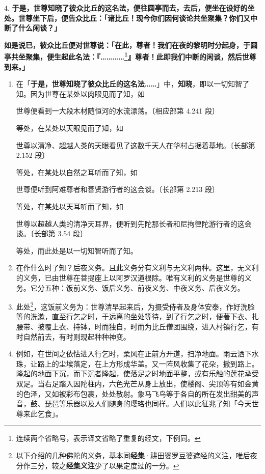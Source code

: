 {\Large 4.} \textbf{于是，世尊知晓了彼众比丘的这名法，便往圆亭而去，去后，便坐在设好的坐处。世尊坐下后，便告众比丘：「诸比丘！现今你们因何谈论共坐聚集？你们又中断了什么闲谈？」}

\textbf{如是说已，彼众比丘便对世尊说：「在此，尊者！我们在夜的黎明时分起身，于圆亭共坐聚集，便生起此名法：『…………\footnote{连续两个省略号，表示译文省略了重复的经文，下例同。}』尊者！此即我们中断的闲谈，然后世尊到来。」}

\begin{enumerate}\item 在「\textbf{于是，世尊知晓了彼众比丘的这名法……}」中，\textbf{知晓}，即以一切知智了知。因为世尊在某处以肉眼见而了知，如\begin{quoting}世尊便看到一大段木材随恒河的水流漂荡。{\bluefootnotesize 〔相应部第 4.241 段〕}\end{quoting}等处，在某处以天眼见而了知，如\begin{quoting}世尊以清净、超越人类的天眼看见了这数千天人在华村占据着基地。{\bluefootnotesize 〔长部第 2.152 段〕}\end{quoting}等处，在某处以自然之耳听而了知，如\begin{quoting}世尊便听到阿难尊者和善贤游行者的这会谈。{\bluefootnotesize 〔长部第 2.213 段〕}\end{quoting}等处，在某处以天耳听而了知，如\begin{quoting}世尊以超越人类的清净天耳界，便听到先陀那长者和尼拘律陀游行者的这会谈。{\bluefootnotesize 〔长部第 3.54 段〕}\end{quoting}等处，而此处是以一切知智听而了知。
\item 在作什么时了知？后夜义务。且此义务分有义利与无义利两种。这里，无义利的义务，已由世尊在菩提座上以阿罗汉道根除。唯有义利的义务是世尊的义务。它分五种：饭前义务、饭后义务、前夜义务、中夜义务、后夜义务。
\item 此处\footnote{以下介绍的几种佛陀的义务，基本同\textbf{经集}·耕田婆罗豆婆遮经的义注，唯后夜分作三分，较之\textbf{经集义注}少了以果定度过的一分。}，这饭前义务为：世尊清早起来后，为摄受侍者及身体安泰，作好洗脸等的洗漱，直至行乞之时，于远离的坐处等待，到了行乞之时，便著下衣、扎腰带、披覆上衣、持钵，时而独自，时而为比丘僧团围绕，进入村镇行乞，有时自然前去，有时则现起种种神变。
\item 例如，在世间之依怙进入行乞时，柔风在正前方开道，扫净地面。雨云洒下水珠，让路上的尘埃落定，在上方形成华盖。又一阵风收集了花朵，撒到路上。隆起的地面下沉，而下沉者隆起，使落足之时地面平整，或有乐触的莲花承受双足。当右足踏入因陀柱内，六色光芒从身上放出，使楼阁、尖顶等有如金黄的色泽，又如被彩布包裹，处处散射。象马飞鸟等于各自的所在发出甜美的声音，鼓、琵琶等乐器以及人们随身的璎珞也同样。人们以此征兆了知「今天世尊来此乞食」。

\end{enumerate}
